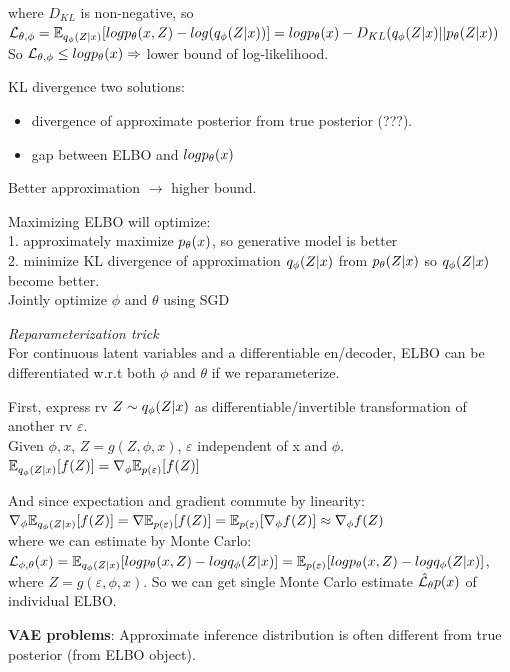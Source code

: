 \documentclass[12pt,a4paper]{article}
\begin{document}
where $D_{KL}$ is non-negative, so $\mathcal{L}_{\theta,\phi}=\mathbb{E}_{q_\phi(Z|x)}[log p_\theta(x,Z)-log(q_\phi(Z|x))]\\
=logp_\theta(x)-D_{KL}(q_\phi(Z|x)||p_\theta(Z|x))$\\
So $\mathcal{L}_{\theta,\phi}\le log p_\theta(x)\Rightarrow$ lower bound of log-likelihood.

KL divergence two solutions:
\begin{itemize}
\item divergence of approximate posterior from true posterior (???).
\item gap between ELBO and $logp_\theta(x)$
\end{itemize}
Better approximation $\rightarrow$ higher bound.

\vspace{0.5cm}
Maximizing ELBO will optimize:\\
1. approximately maximize $p_\theta(x)$, so generative model is better \\
2. minimize KL divergence of approximation $q_\phi(Z|x)$ from $p_\theta(Z|x)$ so $q_\phi(Z|x)$ become better. \\
Jointly optimize $\phi$ and $\theta$ using SGD

\textit{Reparameterization trick}\\
For continuous latent variables and a differentiable en/decoder, ELBO can be differentiated w.r.t both $\phi$ and $\theta$ if we reparameterize. 

First, express rv $Z\sim q_\phi(Z|x)$ as differentiable/invertible transformation of another rv $\varepsilon$.\\
Given $\phi, x$, $Z=g(Z, \phi, x)$, $\varepsilon$ independent of x and $\phi$. \\
$\mathbb{E}_{q_\phi(Z|x)}[f(Z)]=\nabla_\phi\mathbb{E}_{p(\varepsilon)}[f(Z)]$

And since expectation and gradient commute by linearity:\\
$\nabla_\phi\mathbb{E}_{q_\phi(Z|x)}[f(Z)]=\nabla \mathbb{E}_{p(\varepsilon)}[f(Z)]=\mathbb{E}_{p(\varepsilon)}[\nabla_\phi f(Z)] \approx \nabla_\phi f(Z)$\\
where we can estimate by Monte Carlo:\\
$\mathcal{L}_{\phi,\theta}(x)=\mathbb{E}_{q_\phi(Z|x)}[log p_\theta(x,Z)-log q_\phi(Z|x)]=\mathbb{E}_{p(\varepsilon)}[log p_\theta(x,Z)-log q_\phi(Z|x)]$, where $Z=g(\varepsilon,\phi,x)$. 
So we can get single Monte Carlo estimate $\hat{\mathcal{L}}_\theta p(x)$ of individual ELBO. 

\vspace{0.5cm}
\textbf{VAE problems}: 
Approximate inference distribution is often different from true posterior (from ELBO object). 
\end{document}
